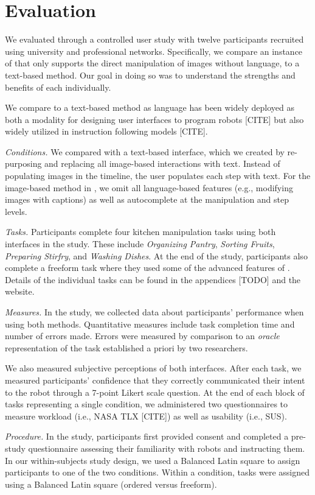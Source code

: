 \section{Evaluation}
We evaluated \projname through a controlled user study with twelve participants recruited using university and professional networks. Specifically, we compare an instance of \projname that only supports the direct manipulation of images without language, to a text-based method. Our goal in doing so was to understand the strengths and benefits of each individually. 

We compare \projname to a text-based method as language has been widely deployed as both a modality for designing user interfaces to program robots [CITE] but also widely utilized in instruction following models [CITE].

\emph{Conditions.} We compared \projname with a text-based interface, which we created by re-purposing \projname and replacing all image-based interactions with text. Instead of populating images in the timeline, the user populates each step with text. For the image-based method in \projname, we omit all language-based features (e.g., modifying images with captions) as well as autocomplete at the manipulation and step levels.

\emph{Tasks.} Participants complete four kitchen manipulation tasks using both interfaces in the study. These include \textit{Organizing Pantry}, \textit{Sorting Fruits}, \textit{Preparing Stirfry}, and \textit{Washing Dishes}. At the end of the study, participants also complete a freeform task where they used some of the advanced features of \projname. Details of the individual tasks can be found in the appendices [TODO] and the website.
 


\emph{Measures.} In the study, we collected data about participants' performance when using both methods. Quantitative measures include task completion time and number of errors made. Errors were measured by comparison to an \textit{oracle} representation of the task established a priori by two researchers.

We also measured subjective perceptions of both interfaces. After each task, we measured participants' confidence that they correctly communicated their intent to the robot through a 7-point Likert scale question. At the end of each block of tasks representing a single condition, we administered two questionnaires to measure workload (i.e., NASA TLX [CITE]) as well as usability (i.e., SUS).


\emph{Procedure.} In the study, participants first provided consent and completed a pre-study questionnaire assessing their familiarity with robots and instructing them. In our within-subjects study design, we used a Balanced Latin square to assign participants to one of the two conditions. Within a condition, tasks were assigned using a Balanced Latin square (ordered versus freeform).
